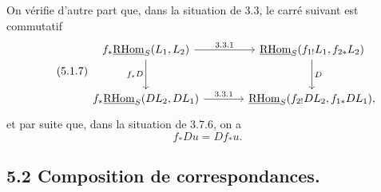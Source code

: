 \documentclass[11pt]{article}
\newcommand{\R}{\mathrm{R}}\newcommand{\RHomCore}{\mathrm{RHom}}
\providecommand{\RHom}{\RHomCore}
\providecommand{\uRHom}{\underline{\RHom}}
\providecommand{\RHom}{\RHomCore}
\providecommand{\RHom}{\R\mathcal{H}om}
\providecommand{\R}{\mathrm R}
\providecommand{\RHom}{\RHomCore}
\begin{document}
On vérifie d'autre part que, dans la situation de 3.3, le carré suivant est commutatif
\begin{equation}
\tag{5.1.7}
\begin{tikzcd}[column sep=large,row sep=large]
f_*\uRHom_S(L_1,L_2) \arrow[r,"3.3.1"] \arrow[d,"f_*D"']
& \uRHom_S(f_{1!}L_1,f_{2*}L_2) \arrow[d,"D"] \\
f_*\uRHom_S(DL_2,DL_1) \arrow[r,"3.3.1"]
& \uRHom_S(f_{2!}DL_2,f_{1*}DL_1),
\end{tikzcd}
\end{equation}
et par suite que, dans la situation de 3.7.6, on a
\begin{equation}
\tag{5.1.8}
f_*Du=Df_*u.
\end{equation}

\subsection*{5.2 Composition de correspondances.}
\end{document}
